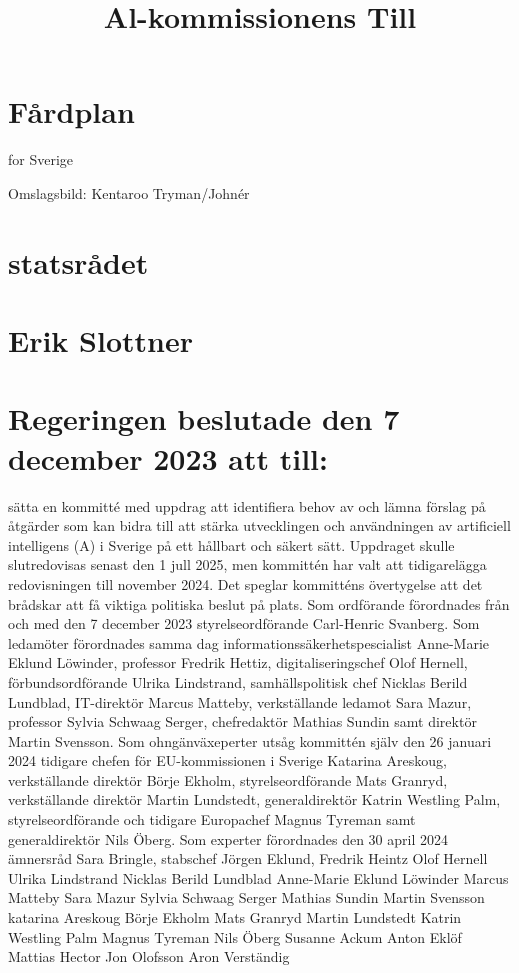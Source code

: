 \title{
Al-kommissionens
}
\section*{Fårdplan}
for Sverige

Omslagsbild: Kentaroo Tryman/Johnér

\title{
Till
}
\section*{statsrådet}
\section*{Erik Slottner}
\section*{Regeringen beslutade den 7 december 2023 att till:} sätta en kommitté med uppdrag att identifiera behov av och lämna förslag på åtgärder som kan bidra till att stärka utvecklingen och användningen av artificiell intelligens (A) i Sverige på ett hållbart och säkert sätt. Uppdraget skulle slutredovisas senast den 1 jull 2025, men kommittén har valt att tidigarelägga redovisningen till november 2024. Det speglar kommitténs övertygelse att det brådskar att få viktiga politiska beslut på plats.
Som ordförande förordnades från och med den 7 december 2023 styrelseordförande Carl-Henric Svanberg. Som ledamöter förordnades samma dag informationssäkerhetspescialist Anne-Marie Eklund Löwinder, professor Fredrik Hettiz, digitaliseringschef Olof Hernell, förbundsordförande Ulrika Lindstrand, samhällspolitisk chef Nicklas Berild Lundblad, IT-direktör Marcus Matteby, verkställande ledamot Sara Mazur, professor Sylvia Schwaag Serger, chefredaktör Mathias Sundin samt direktör Martin Svensson.
Som ohngänväxeperter utsåg kommittén själv den 26 januari 2024 tidigare chefen för EU-kommissionen i Sverige Katarina Areskoug, verkställande direktör Börje Ekholm, styrelseordförande Mats Granryd, verkställande direktör Martin Lundstedt, generaldirektör Katrin Westling Palm, styrelseordförande och tidigare Europachef Magnus Tyreman samt generaldirektör Nils Öberg.
Som experter förordnades den 30 april 2024 ämnersråd Sara Bringle, stabschef Jörgen Eklund,
Fredrik Heintz
Olof Hernell
Ulrika Lindstrand
Nicklas Berild Lundblad
Anne-Marie Eklund Löwinder
Marcus Matteby
Sara Mazur
Sylvia Schwaag Serger
Mathias Sundin
Martin Svensson
katarina Areskoug
Börje Ekholm
Mats Granryd
Martin Lundstedt
Katrin Westling Palm
Magnus Tyreman
Nils Öberg
Susanne Ackum
Anton Eklöf
Mattias Hector
Jon Olofsson
Aron Verständig


